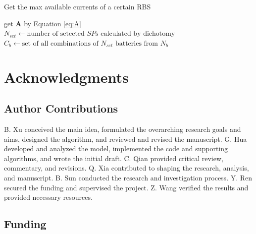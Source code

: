 \documentclass{article}
\begin{document}
\begin{algorithm}
    \caption{Get the max available currents of a certain RBS}\label{alg:greedy}
    \KwResult{$\max \eta$}
    get $\bm{A}$ by Equation \ref{eq:A}\;
    {
        $N_{set} \leftarrow \text{number of setected $SP$s calculated by dichotomy}$\;
        $C_b    \leftarrow \text{set of all combinations of $N_{set} $~batteries from $N_b$}$\;
    }
\end{algorithm}

\section*{Acknowledgments}

\subsection*{Author Contributions} 

B. Xu conceived the main idea, formulated the overarching research goals and aims, designed the algorithm, and reviewed and revised the manuscript.
G. Hua developed and analyzed the model, implemented the code and supporting algorithms, and wrote the initial draft.
C. Qian provided critical review, commentary, and revisions.
Q. Xia contributed to shaping the research, analysis, and manuscript.
B. Sun conducted the research and investigation process.
Y. Ren secured the funding and supervised the project.
Z. Wang verified the results and provided necessary resources.

\subsection*{Funding}
\end{document}
